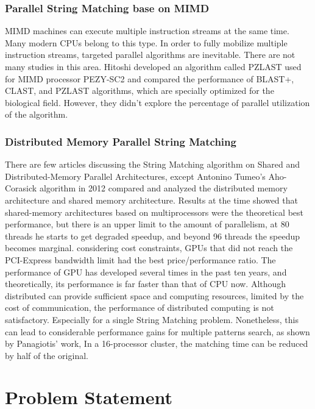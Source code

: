 \documentclass[11pt]{article}       %
\begin{document}
\subsubsection{Parallel String Matching base on MIMD}
MIMD machines can execute multiple instruction streams at the same time. Many modern CPUs belong to this type. In order to fully mobilize multiple instruction streams, targeted parallel algorithms are inevitable. There are not many studies in this area. Hitoshi developed an algorithm called PZLAST used for MIMD processor PEZY-SC2 and compared the performance of BLAST+, CLAST, and PZLAST algorithms\cite{MIMD}, which are specially optimized for the biological field. However, they didn't explore the percentage of parallel utilization of the algorithm.


\subsubsection{Distributed Memory Parallel String Matching}
There are few articles discussing the String Matching algorithm on Shared and Distributed-Memory Parallel Architectures, except Antonino Tumeo's Aho-Corasick algorithm in 2012 compared and analyzed the distributed memory architecture and shared memory architecture\cite{Distributed-Memory}. Results at the time showed that shared-memory architectures based on multiprocessors were the theoretical best performance, but there is an upper limit to the amount of parallelism, at 80 threads he starts to get degraded speedup, and beyond 96 threads the speedup becomes marginal. considering cost constraints, GPUs that did not reach the PCI-Express bandwidth limit had the best price/performance ratio. The performance of GPU has developed several times in the past ten years, and theoretically, its performance is far faster than that of CPU now. Although distributed can provide sufficient space and computing resources, limited by the cost of communication, the performance of distributed computing is not satisfactory. Especially for a single String Matching problem. Nonetheless, this can lead to considerable performance gains for multiple patterns search, as shown by Panagiotis' work\cite{MPI}, In a 16-processor cluster, the matching time can be reduced by half of the original.


\section{Problem Statement} \label{problemStatement}
\end{document}
